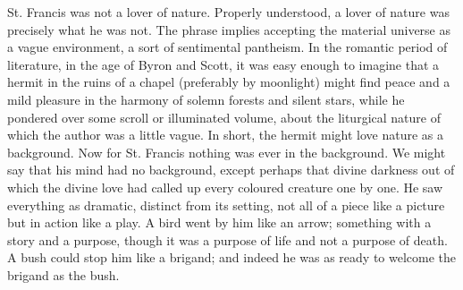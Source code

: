 \documentclass{book}
\begin{document}
St. Francis was not a lover of nature. Properly understood, a lover of nature was precisely what he was not. The phrase implies accepting the material universe as a vague environment, a sort of sentimental pantheism. In the romantic period of literature, in the age of Byron and Scott, it was easy enough to imagine that a hermit in the ruins of a chapel (preferably by moonlight) might find peace and a mild pleasure in the harmony of solemn forests and silent stars, while he pondered over some scroll or illuminated volume, about the liturgical nature of which the author was a little vague. In short, the hermit might love nature as a background. Now for St. Francis nothing was ever in the background. We might say that his mind had no background, except perhaps that divine darkness out of which the divine love had called up every coloured creature one by one. He saw everything as dramatic, distinct from its setting, not all of a piece like a picture but in action like a play. A bird went by him like an arrow; something with a story and a purpose, though it was a purpose of life and not a purpose of death. A bush could stop him like a brigand; and indeed he was as ready to welcome the brigand as the bush.
\end{document}

